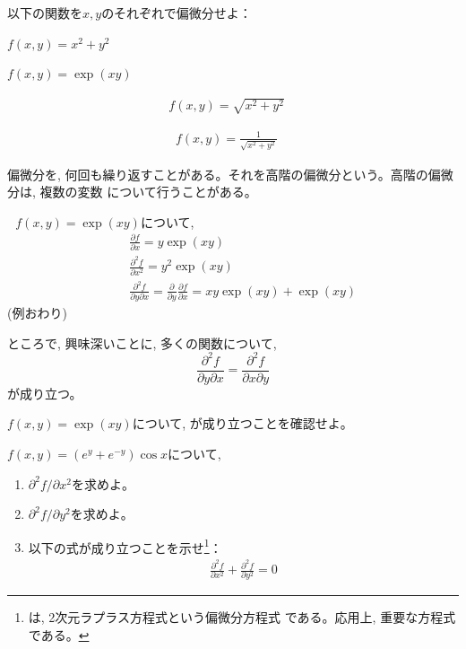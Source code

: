 \begin{q}\label{q:univ_part_deriv0} 以下の関数を$x, y$のそれぞれで偏微分せよ：
\begin{edaenumerate}
\item $f(x,y)=x^2+y^2$
\item $f(x,y)=\exp(xy)$
\item \begin{eqnarray*}f(x,y)=\sqrt{x^2+y^2}\,\,\,\,\,\,\end{eqnarray*}
\item \begin{eqnarray*}f(x,y)=\frac{1}{\sqrt{x^2+y^2}}\,\,\,\,\,\,\end{eqnarray*}
\end{edaenumerate}\end{q}
\mv

偏微分を, 何回も繰り返すことがある。それを高階の偏微分という。高階の偏微分は, 複数の変数
について行うことがある。\\

\begin{exmpl} $\,\,\,\,f(x,y)=\exp(xy)$について, 
\begin{eqnarray}
&&\frac{\partial f}{\partial x}=y\exp(xy)\\
&&\frac{\partial^2 f}{\partial x^2}=y^2\exp(xy)\\
&&\frac{\partial^2 f}{\partial y \partial x}=\frac{\partial}{\partial y}\frac{\partial f}{\partial x}=xy\exp(xy)+\exp(xy)
\end{eqnarray}
(例おわり)\end{exmpl}
\mv

ところで, 興味深いことに, 多くの関数について, 
\begin{equation}
\frac{\partial^2 f}{\partial y \partial x}=\frac{\partial^2 f}{\partial x \partial y}
\label{eq:pderivorder}
\end{equation}
が成り立つ。\\

\begin{q}\label{q:univ_part_deriv2} $f(x,y)=\exp(xy)$について, 
が成り立つことを確認せよ。
\end{q}\mv

\begin{q}\label{q:univ_part_deriv4} $f(x,y)=(e^y+e^{-y}) \cos x$について, 
\begin{enumerate}
\item $\partial^2 f/\partial x^2$を求めよ。
\item $\partial^2 f/\partial y^2$を求めよ。
\item 以下の式が成り立つことを示せ\footnote{は, 2次元ラプラス方程式という偏微分方程式
である。応用上, 重要な方程式である。}：
\begin{eqnarray}
\frac{\partial^2 f}{\partial x^2}+\frac{\partial^2 f}{\partial y^2}=0
\label{eq:2DLaplace}\end{eqnarray}
\end{enumerate}\end{q}
\vv

